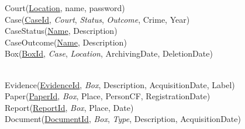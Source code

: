 Court(\underline{Location}, name, password) \\
Case(\underline{CaseId}, \textit{Court}, \textit{Status}, \textit{Outcome}, Crime, Year) \\
CaseStatus(\underline{Name}, Description) \\
CaseOutcome(\underline{Name}, Description) \\
Box(\underline{BoxId}, \textit{Case}, \textit{Location}, ArchivingDate, DeletionDate)

\noindent \\
Evidence(\underline{EvidenceId}, \textit{Box}, Description, AcquisitionDate, Label) \\
Paper(\underline{PaperId}, \textit{Box}, Place, PersonCF, RegistrationDate) \\
Report(\underline{ReportId}, \textit{Box}, Place, Date) \\
Document(\underline{DocumentId}, \textit{Box}, \textit{Type}, Description, AcquisitionDate) \\
